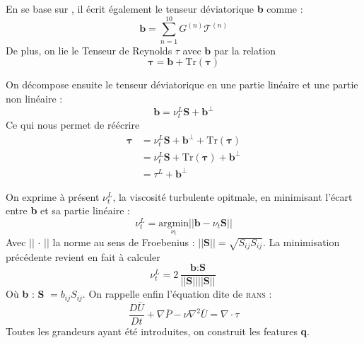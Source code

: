 \documentclass[a4paper,12pt]{report}
\newcommand{\bepar}[1]{
	\left( #1 \right)  
}
\newcommand{\norm}[1]{
	\left \vert \left \vert #1 \right \vert  \right \vert
}
\numberwithin{equation}{section} %
\begin{document}
\noindent En se base sur \cite{pope1975more} , il écrit également le tenseur déviatorique \textbf{b} comme : 
\begin{equation*}
\textbf{b} = \sum_{n=1}^{10} G^{(n)} \mathcal{T}^{(n)}
\end{equation*}
De plus, on lie le Tenseur de Reynolds \textbf{$\tau$} avec $\textbf{b}$ par la relation \begin{equation*}
\mathbf{\tau }= \textbf{b} + \text{Tr}\bepar{\mathbf{\tau}} 
\end{equation*}

\noindent On décompose ensuite le tenseur déviatorique en une partie linéaire et une partie non linéaire :
\begin{equation*}
\textbf{b} = \nu_t^L\textbf{S} + \textbf{b}^\perp
\end{equation*}
Ce qui nous permet de réécrire 
\begin{align*}
\mathbf{\tau }&= \nu_t^L\textbf{S} + \textbf{b}^\perp + \text{Tr}\bepar{\mathbf{\tau}} \\
&= \nu_t^L\textbf{S} + \text{Tr}\bepar{\mathbf{\tau}}  + \textbf{b}^\perp \\
&= \tau^L + \textbf{b}^\perp
\end{align*}

\noindent On exprime à présent $\nu_t^L$, la viscosité turbulente opitmale, en minimisant l'écart entre \textbf{b} et sa partie linéaire : $$\nu_t^L = \underset{\nu_t}{\text{argmin}} \norm{\textbf{b} - \nu_t\textbf{S}} $$
Avec $\norm{\, \cdot \, }$ la norme au sens de Froebenius : $\norm{\textbf{S}} = \sqrt{S_{ij}S_{ij}}$. La minimisation précédente revient en fait à calculer $$ \nu_t^L = 2\,  \frac{\textbf{b}:\textbf{S}}{\norm{\textbf{S}} \norm{\textbf{S}}}$$ Où \textbf{b} : \textbf{S} $= b_{ij}S_{ij}$.
On rappelle enfin l'équation dite de \textsc{rans} :
$$ \frac{D\overline{U} }{Dt} + \nabla \overline{P} - \nu \nabla^2 \overline{U} = \nabla \cdot \tau$$
\noindent Toutes les grandeurs ayant été introduites, on construit les features \textbf{q}.\\[2mm]
\end{document}
